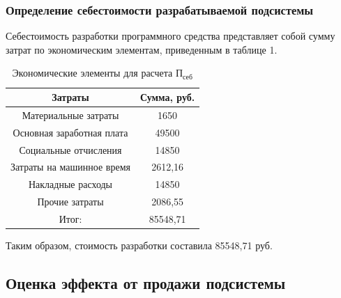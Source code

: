 \documentclass[a4paper]{extarticle}
\numberwithin{equation}{section}
\begin{document}
\subsubsection{Определение себестоимости разрабатываемой подсистемы}
Себестоимость разработки программного средства представляет собой сумму затрат по экономическим элементам, приведенным в таблице 1.\par
\begin{table}[H]
\caption{Экономические элементы для расчета $\text{П}_\text{себ}$}
  \begin{tabular}{|c|c|}
  \hline
  Затраты & Сумма, руб. \\\hline
  Материальные затраты & 1650 \\\hline
  Основная заработная плата & 49500 \\\hline
  Социальные отчисления & 14850 \\\hline
  Затраты на машинное время & 2612,16 \\\hline
  Накладные расходы & 14850 \\\hline
  Прочие затраты & 2086,55 \\\hline
  Итог: & 85548,71 \\
  \hline
  \end{tabular}
\end{table}\par
Таким образом, стоимость разработки составила 85548,71 руб.\par

\subsection{Оценка эффекта от продажи подсистемы}
\end{document}
